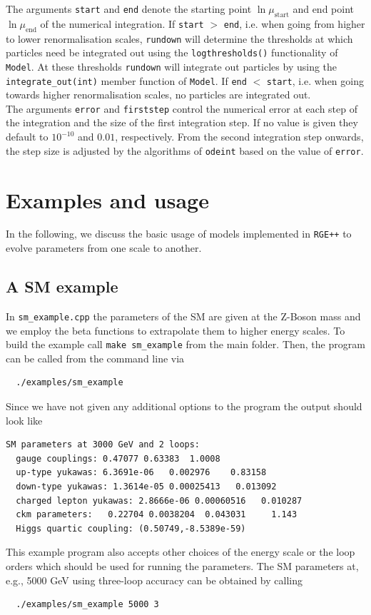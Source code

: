 \documentclass[11pt,a4paper]{article}
\begin{document}
The arguments \texttt{start} and \texttt{end} denote the starting point $\ln\mu_{\mathrm{start}}$ and end point $\ln\mu_{\mathrm{end}}$ of the numerical integration. If \texttt{start} $>$ \texttt{end}, i.e. when going from higher to lower renormalisation scales, \texttt{rundown} will determine the thresholds at which particles need be integrated out using the \texttt{logthresholds()} functionality of \texttt{Model}. At these thresholds \texttt{rundown} will integrate out particles by using the \texttt{integrate\_out(int)} member function of \texttt{Model}. If \texttt{end} $<$ \texttt{start}, i.e. when going towards higher renormalisation scales, no particles are integrated out.\\
The arguments \texttt{error} and \texttt{firststep} control the numerical error at each step of the integration and the size of the first integration step. If no value is given they default to $10^{-10}$ and $0.01$, respectively. From the second integration step onwards, the step size is adjusted by the algorithms of \texttt{odeint} based on the value of \texttt{error}.

\section{\label{sec::examples}Examples and usage}
In the following, we discuss the basic usage of models implemented in \texttt{RGE++} to evolve parameters from one scale to another.


\subsection{\label{sec::sm_example} A SM example}
In \texttt{sm\_example.cpp} the parameters of the SM are given at the Z-Boson mass and we employ the beta functions to extrapolate them to higher energy scales. 
To build the example call \texttt{make sm\_example} from the main folder. Then, the program can be called from the command line via
\begin{lstlisting}
  ./examples/sm_example
\end{lstlisting}
Since we have not given any additional options to the program the output should look like
\begin{lstlisting}[keywordstyle=\color{blue}]
  SM parameters at 3000 GeV and 2 loops:
  gauge couplings: 0.47077 0.63383  1.0008
  up-type yukawas: 6.3691e-06   0.002976    0.83158
  down-type yukawas: 1.3614e-05 0.00025413   0.013092
  charged lepton yukawas: 2.8666e-06 0.00060516   0.010287
  ckm parameters:   0.22704 0.0038204  0.043031     1.143
  Higgs quartic coupling: (0.50749,-8.5389e-59)
\end{lstlisting}
This example program also accepts other choices of the energy scale or the loop orders which should be used for running the parameters.
The SM parameters at, e.g., 5000 GeV using three-loop accuracy can be obtained by calling
\begin{lstlisting}
  ./examples/sm_example 5000 3
\end{lstlisting}
\end{document}
